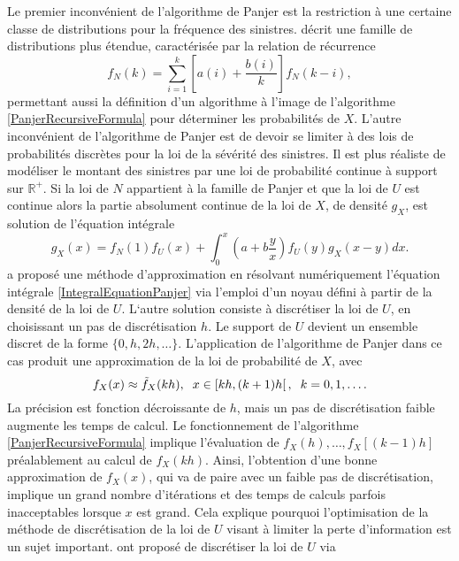 Le premier inconvénient de l\rq{}algorithme de Panjer est la restriction à une certaine classe de distributions pour la fréquence des sinistres. \citet{Su92} décrit une famille de distributions plus étendue, caractérisée par la relation de récurrence 
\begin{equation}
f_{N}(k)=\sum_{i=1}^{k}\left[a(i)+\frac{b(i)}{k}\right]f_{N}(k-i),
\end{equation} 
permettant aussi la définition d\rq{}un algorithme à l\rq{}image de l\rq{}algorithme \eqref{PanjerRecursiveFormula} pour déterminer les probabilités de $X$. L\rq{}autre inconvénient de l\rq{}algorithme de Panjer est de devoir se limiter à des lois de probabilités discrètes pour la loi de la sévérité des sinistres. Il est plus réaliste de modéliser le montant des sinistres par une loi de probabilité continue à support sur $\mathbb{R}^{+}$. Si la loi de $N$ appartient à la famille de Panjer et que la loi de $U$ est continue alors la partie absolument continue de la loi de $X$, de densité $g_{X}$, est solution de l\rq{}équation intégrale 
\begin{equation}\label{IntegralEquationPanjer}
g_{X}(x)=f_{N}(1)f_{U}(x)+\int_{0}^{x}\left(a+b\frac{y}{x}\right)f_{U}(y)g_{X}(x-y)dx.
\end{equation}   
\citet{St85} a proposé une méthode d\rq{}approximation en résolvant numériquement l\rq{}équation intégrale \eqref{IntegralEquationPanjer} via l\rq{}emploi d\rq{}un noyau défini à partir de la densité de la loi de $U$. L\lq{}autre solution consiste à discrétiser la loi de $U$, en choisissant un pas de discrétisation $h$. Le support de $U$ devient un ensemble discret de la forme $\{0, h, 2h,\ldots\}$. L\rq{}application de l\rq{}algorithme de Panjer dans ce cas produit une approximation de la loi de probabilité de $X$, avec
\begin{equation}
f_{X}(x) \approx \tilde{f}_{X}(kh),\hspace{0.2cm}x\in\left[kh,(k+1)h\right[, \hspace{0.2cm} k=0,1,\ldots.
\end{equation}
La précision est fonction décroissante de $h$, mais un pas de discrétisation faible augmente les temps de calcul. Le fonctionnement de l\rq{}algorithme \eqref{PanjerRecursiveFormula} implique l\rq{}évaluation de $f_{X}(h),\ldots,f_{X}\left[(k-1)h \right]$ préalablement au calcul de $f_{X}\left(kh \right)$. Ainsi, l\rq{}obtention d\rq{}une bonne approximation de $f_{X}(x)$, qui va de paire avec un faible pas de discrétisation, implique un grand nombre d\rq{}itérations et des temps de calculs parfois inacceptables lorsque $x$ est grand. Cela explique pourquoi l\rq{}optimisation de la méthode de discrétisation de la loi de $U$ visant à limiter la perte d\rq{}information est un sujet important. \citet{GeJo76} ont proposé de discrétiser la loi de $U$ via 
